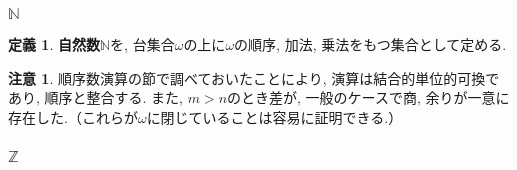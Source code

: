 \documentclass[a4paper, twoside]{bxjsarticle}
\newcommand{\nat}{\mathbb{N}}
\newcommand{\zah}{\mathbb{Z}}
\theoremstyle{definition}
\newtheorem{defn}[thm]{定義}
\newtheorem{rem}[thm]{注意}
\begin{document}
    \subsubsection{$\nat$}
        \begin{defn}
            \textbf{自然数}$\nat$を, 台集合$\omega$の上に$\omega$の順序, 加法, 乗法をもつ集合として定める.
        \end{defn}
        \begin{rem}
            順序数演算の節で調べておいたことにより, 演算は結合的単位的可換であり, 順序と整合する. また, $m>n$のとき差が, 一般のケースで商, 余りが一意に存在した.（これらが$\omega$に閉じていることは容易に証明できる.）
        \end{rem}
    \subsubsection{$\zah$}
\end{document}
